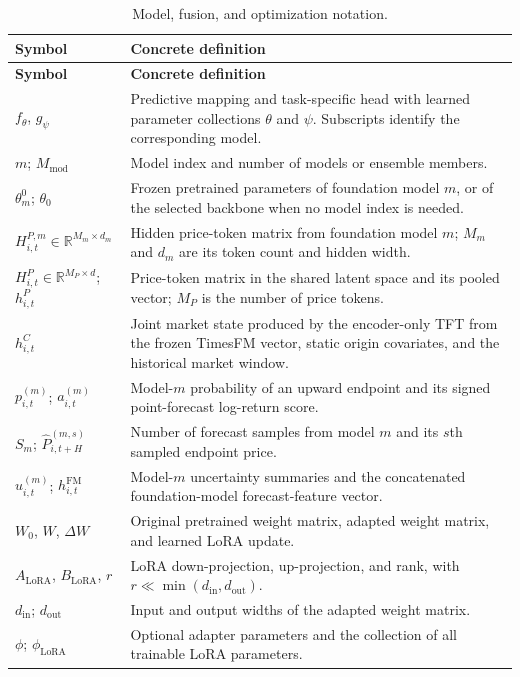 \documentclass[11pt]{article}
\newcommand{\R}{\mathbb{R}}
\begin{document}
{\begin{longtable}{@{}p{}p{}@{}}
\caption{Model, fusion, and optimization notation.}
\label{tab:notation-models}\\
\toprule
\textbf{Symbol} & \textbf{Concrete definition} \\
\midrule
\endfirsthead
\toprule
\textbf{Symbol} & \textbf{Concrete definition} \\
\midrule
\endhead
$f_\theta$, $g_\psi$ & Predictive mapping and task-specific head with learned parameter collections $\theta$ and $\psi$. Subscripts identify the corresponding model. \\
$m$; $M_{\mathrm{mod}}$ & Model index and number of models or ensemble members. \\
$\theta_m^0$; $\theta_0$ & Frozen pretrained parameters of foundation model $m$, or of the selected backbone when no model index is needed. \\
$H^{P,m}_{i,t}\in\R^{M_m\times d_m}$ & Hidden price-token matrix from foundation model $m$; $M_m$ and $d_m$ are its token count and hidden width. \\
$H^P_{i,t}\in\R^{M_P\times d}$; $h^P_{i,t}$ & Price-token matrix in the shared latent space and its pooled vector; $M_P$ is the number of price tokens. \\
$h^C_{i,t}$ & Joint market state produced by the encoder-only TFT from the frozen TimesFM vector, static origin covariates, and the historical market window. \\
$p^{(m)}_{i,t}$; $a^{(m)}_{i,t}$ & Model-$m$ probability of an upward endpoint and its signed point-forecast log-return score. \\
$S_m$; $\widehat P^{(m,s)}_{i,t+H}$ & Number of forecast samples from model $m$ and its $s$th sampled endpoint price. \\
$u^{(m)}_{i,t}$; $h^{\mathrm{FM}}_{i,t}$ & Model-$m$ uncertainty summaries and the concatenated foundation-model forecast-feature vector. \\
$W_0$, $W$, $\Delta W$ & Original pretrained weight matrix, adapted weight matrix, and learned LoRA update. \\
$A_{\mathrm{LoRA}}$, $B_{\mathrm{LoRA}}$, $r$ & LoRA down-projection, up-projection, and rank, with $r\ll\min(d_{\mathrm{in}},d_{\mathrm{out}})$. \\
$d_{\mathrm{in}}$; $d_{\mathrm{out}}$ & Input and output widths of the adapted weight matrix. \\
$\phi$; $\phi_{\mathrm{LoRA}}$ & Optional adapter parameters and the collection of all trainable LoRA parameters. \\

\end{longtable}}
\end{document}
